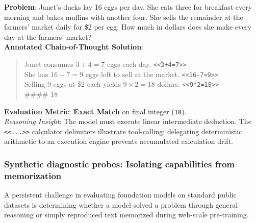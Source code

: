 \documentclass[../../main.tex]{subfiles}
\begin{document}
\begin{center}
\begin{minipage}{0.95\textwidth}
\begin{tcolorbox}[colback=cardBg,colframe=cardLine,arc=2pt,boxrule=0.5pt,title=\textbf{Task Example: Multi-Step Mathematical Reasoning (GSM8K)}]
\small\sffamily
\textbf{Problem}: Janet’s ducks lay 16 eggs per day. She eats three for breakfast every morning and bakes muffins with another four. She sells the remainder at the farmers' market daily for \$2 per egg. How much in dollars does she make every day at the farmers' market? \\
\textbf{Annotated Chain-of-Thought Solution}:
\begin{quote}
Janet consumes $3 + 4 = 7$ eggs each day. \texttt{<<3+4=7>>} \\
She has $16 - 7 = 9$ eggs left to sell at the market. \texttt{<<16-7=9>>} \\
Selling 9 eggs at \$2 each yields $9 \times 2 = 18$ dollars. \texttt{<<9*2=18>>} \\
\#\#\#\# 18
\end{quote}
\textbf{Evaluation Metric}: \textbf{Exact Match} on final integer (\texttt{18}). \\
\textit{Reasoning Insight}: The model must execute linear intermediate deduction. The \texttt{<<...>>} calculator delimiters illustrate tool-calling: delegating deterministic arithmetic to an execution engine prevents accumulated calculation drift.
\end{tcolorbox}
\end{minipage}
\end{center}

\subsubsection{Synthetic diagnostic probes: Isolating capabilities from memorization}
\label{subsec:synthetic_probe_tasks}
A persistent challenge in evaluating foundation models on standard public datasets is determining whether a model solved a problem through general reasoning or simply reproduced text memorized during web-scale pre-training.
\end{document}

